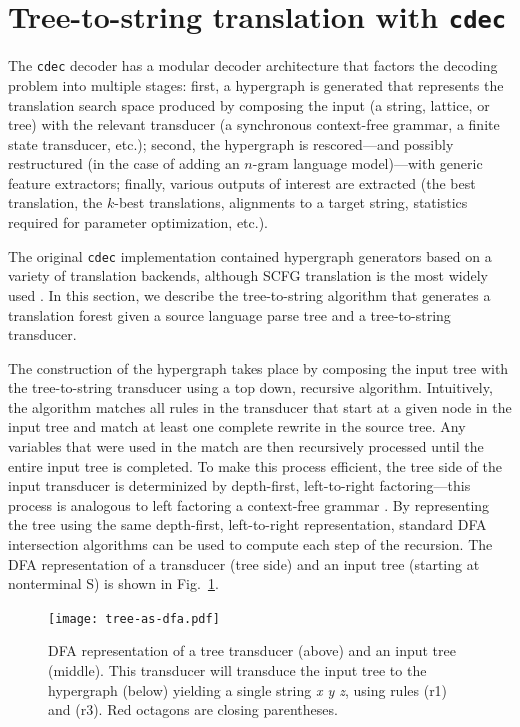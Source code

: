 \documentclass[nofonts]{pbml} %
\begin{document}
\section{Tree-to-string translation with {\tt cdec}}
\label{sec:cdec}

The {\tt cdec} decoder \citep{Dyer_etal_2010} has a modular decoder architecture that factors the decoding problem into multiple stages: first, a hypergraph is generated that represents the translation search space produced by composing the input (a string, lattice, or tree) with the relevant transducer (a synchronous context-free grammar, a finite state transducer, etc.); second, the hypergraph is rescored---and possibly restructured (in the case of adding an $n$-gram language model)---with generic feature extractors; finally, various outputs of interest are extracted (the best translation, the $k$-best translations, alignments to a target string, statistics required for parameter optimization, etc.).

The original {\tt cdec} implementation contained hypergraph generators based on a variety of translation backends, although SCFG translation is the most widely used \citep{chiang:2007}. In this section, we describe the tree-to-string algorithm that generates a translation forest given a source language parse tree and a tree-to-string transducer.

The construction of the hypergraph takes place by composing the input tree with the tree-to-string transducer using a top down, recursive algorithm. Intuitively, the algorithm matches all rules in the transducer that start at a given node in the input tree and match at least one complete rewrite in the source tree. Any variables that were used in the match are then recursively processed until the entire input tree is completed. To make this process efficient, the tree side of the input transducer is determinized by depth-first, left-to-right factoring---this process is analogous to left factoring a context-free grammar \citep{klein:2001}. By representing the tree using the same depth-first, left-to-right representation, standard DFA intersection algorithms can be used to compute each step of the recursion. The DFA representation of a transducer (tree side) and an input tree (starting at nonterminal S) is shown in Fig.~\ref{fig:det}.

\begin{figure}[t]
\centering
\texttt{[image: tree-as-dfa.pdf]}
\caption{\label{fig:det}DFA representation of a tree transducer (above) and an input tree (middle). This transducer will transduce the input tree to the hypergraph (below) yielding a single string \emph{x y z}, using rules (r1) and (r3). Red octagons are closing parentheses.}
\end{figure}
\end{document}
